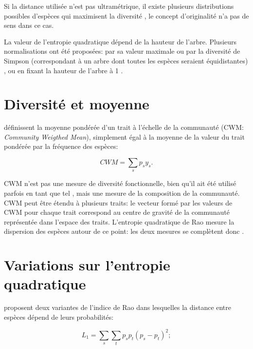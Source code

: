 \documentclass[
  11pt,
  french,
  a4paper,
  extrafontsizes,onecolumn,openright
  ]{memoir}
\newlength{\rf}
\begin{document}
Si la distance utilisée n'est pas ultramétrique, il existe plusieurs distributions possibles d'espèces qui maximisent la diversité \autocite{Pavoine2009}, le concept d'originalité n'a pas de sens dans ce cas.

La valeur de l'entropie quadratique dépend de la hauteur de l'arbre.
Plusieurs normalisations ont été proposées: par sa valeur maximale ou par la diversité de Simpson (correspondant à un arbre dont toutes les espèces seraient équidistantes) \autocite{Ricotta2005c}, ou en fixant la hauteur de l'arbre à 1 \autocite{Marcon2014b}.

\hypertarget{diversituxe9-et-moyenne}{%
\section{Diversité et moyenne}\label{diversituxe9-et-moyenne}}

\textcite{Garnier2004} définissent la moyenne pondérée d'un trait à l'échelle de la communauté (CWM: \emph{Community Weigthed Mean}), simplement égal à la moyenne de la valeur du trait pondérée par la fréquence des espèces:

\begin{equation}
  \label{eq:CWM}
  \mathit{CWM} = \sum_s{p_s y_s}.
\end{equation}

CWM n'est pas une mesure de diversité fonctionnelle, bien qu'il ait été utilisé parfois en tant que tel \autocite{Lavorel2008}, mais une mesure de la composition de la communauté.
CWM peut être étendu à plusieurs traits: le vecteur formé par les valeurs de CWM pour chaque trait correspond au centre de gravité de la communauté représentée dans l'espace des traits.
L'entropie quadratique de Rao mesure la dispersion des espèces autour de ce point: les deux mesures se complètent donc \autocite{Ricotta2011}.

\hypertarget{variations-sur-lentropie-quadratique}{%
\section{Variations sur l'entropie quadratique}\label{variations-sur-lentropie-quadratique}}

\textcite{Izsak2011} proposent deux variantes de l'indice de Rao dans lesquelles la distance entre espèces dépend de leurs probabilités:

\begin{equation}
  \label{eq:L1}
  L_1 = \sum_{s}{\sum_{t}{p_{s}p_{t}{\left(p_{s}-p_{t}\right)}^2}};
\end{equation}
\end{document}
